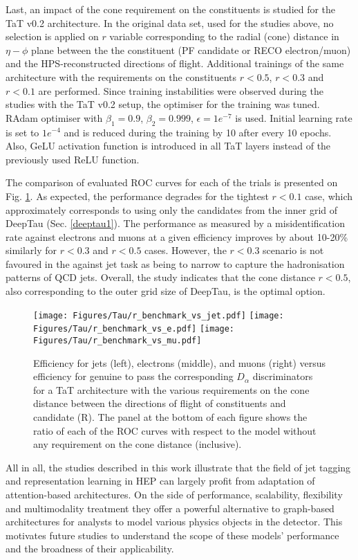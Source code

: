 Last, an impact of the cone requirement on the constituents is studied for the TaT v0.2 architecture. In the original data set, used for the studies above, no selection is applied on $r$ variable corresponding to the radial (cone) distance in $\eta-\phi$ plane between the the constituent (PF candidate or RECO electron/muon) and the HPS-reconstructed \tauh directions of flight. Additional trainings of the same architecture with the requirements on the constituents $r<0.5$, $r<0.3$ and $r<0.1$ are performed. Since training instabilities were observed during the studies with the TaT v0.2 setup, the optimiser for the training was tuned. RAdam \cite{liu2019variance} optimiser with $\beta_1=0.9$, $\beta_2=0.999$, $\epsilon=1e^{-7}$ is used. Initial learning rate is set to $1e^{-4}$ and is reduced during the training by 10 after every 10 epochs.  Also, GeLU activation function \cite{hendrycks2016gaussian} is introduced in all TaT layers instead of the previously used ReLU function.

The comparison of evaluated ROC curves for each of the trials is presented on Fig. \ref{fig:r_benchmark}. As expected, the performance degrades for the tightest $r < 0.1$ case, which approximately corresponds to using only the candidates from the inner grid of DeepTau (Sec. \ref{deeptau1}). The performance as measured by a misidentification rate against electrons and muons at a given \tauh efficiency improves by about 10-20\% similarly for $r < 0.3$ and $r < 0.5$ cases. However, the $r < 0.3$ scenario is not favoured in the against jet task as being to narrow to capture the hadronisation patterns of QCD jets. Overall, the study indicates that the cone distance $r < 0.5$, also corresponding to the outer grid size of DeepTau, is the optimal option.  

\begin{figure}[t!]
    \centering
    \texttt{[image: Figures/Tau/r\_benchmark\_vs\_jet.pdf]}
    \texttt{[image: Figures/Tau/r\_benchmark\_vs\_e.pdf]}
    \texttt{[image: Figures/Tau/r\_benchmark\_vs\_mu.pdf]}
    \caption{Efficiency for jets (left), electrons (middle), and muons (right) versus efficiency for genuine \tauh to pass the corresponding $D_\alpha$ discriminators for a TaT architecture with the various requirements on the cone distance between the directions of flight of constituents and \tauh candidate (R). The panel at the bottom of each figure shows the ratio of each of the ROC curves with respect to the model without any requirement on the cone distance (inclusive).}
    \label{fig:r_benchmark}
\end{figure}

All in all, the studies described in this work illustrate that the field of jet tagging and representation learning in HEP can largely profit from adaptation of attention-based architectures. On the side of performance, scalability, flexibility and multimodality treatment they offer a powerful alternative to graph-based architectures for analysts to model various physics objects in the detector. This motivates future studies to understand the scope of these models' performance and the broadness of their applicability.